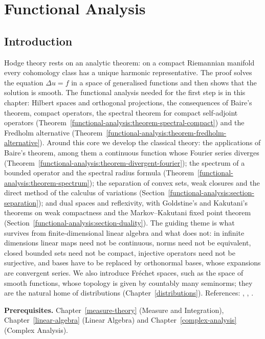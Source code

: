 \chapter{Functional Analysis}\label{functional-analysis}

\section{Introduction}\label{functional-analysis:section-introduction}

Hodge theory rests on an analytic theorem: on a compact Riemannian manifold every cohomology class has a unique harmonic
representative. The proof solves the equation $\Delta u = f$ in a space of generalised functions and then shows that the solution is
smooth. The functional analysis needed for the first step is in this chapter: Hilbert spaces and orthogonal projections, the
consequences of Baire's theorem, compact operators, the spectral theorem for compact self-adjoint operators
(Theorem~\ref{functional-analysis:theorem-spectral-compact}) and the Fredholm alternative
(Theorem~\ref{functional-analysis:theorem-fredholm-alternative}). Around this core we develop the classical theory: the applications of Baire's theorem,
among them a continuous function whose Fourier series diverges (Theorem~\ref{functional-analysis:theorem-divergent-fourier}); the spectrum of a bounded operator and the
spectral radius formula (Theorem~\ref{functional-analysis:theorem-spectrum}); the separation of convex sets, weak closures and the direct method of the calculus of variations
(Section~\ref{functional-analysis:section-separation}); and dual spaces and reflexivity, with Goldstine's and Kakutani's theorems on weak compactness and the Markov--Kakutani fixed point theorem (Section~\ref{functional-analysis:section-duality}). The guiding theme is what survives from finite-dimensional linear algebra and what does not: in infinite
dimensions linear maps need not be continuous, norms need not be equivalent, closed bounded sets need not be compact, injective operators need not be surjective, and bases have to be replaced by
orthonormal bases, whose expansions are convergent series. We also introduce Fr\'echet spaces, such as the space of smooth functions, whose topology is given by countably many seminorms; they are the
natural home of distributions (Chapter~\ref{distributions}). References: \cite{brezis-functional}, \cite{rudin-fa}, \cite{reed-simon-1}.

\noindent\textbf{Prerequisites.} Chapter~\ref{measure-theory} (Measure and Integration), Chapter~\ref{linear-algebra} (Linear Algebra) and Chapter~\ref{complex-analysis}
(Complex Analysis).

